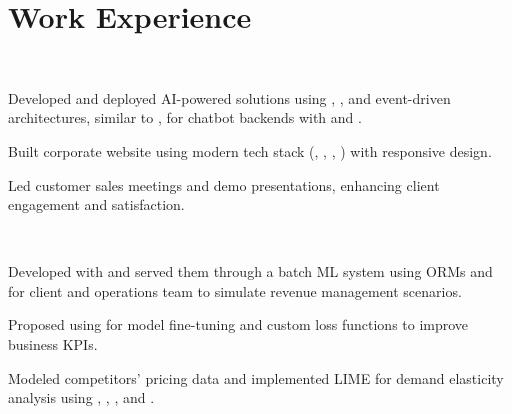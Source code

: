 \documentclass[]{tex/deedy-resume-openfont}
\begin{document}
\hfill
\begin{minipage}[t]{0.66\textwidth} 


\section{Work Experience}
\\
\vspace{\topsep}
\begin{tightemize}
    \item Developed and deployed AI-powered solutions using , , and event-driven architectures, similar to , for chatbot backends with  and .
    \item Built corporate website using modern tech stack (, , , ) with responsive design.
    \item Led customer sales meetings and demo presentations, enhancing client engagement and satisfaction.
\end{tightemize}
\sectionsep

\\
\begin{tightemize}
    \item Developed  with  and served them through a batch ML system using  ORMs and  for client and operations team to simulate revenue management scenarios.
    \item Proposed using  for model fine-tuning and custom loss functions to improve business KPIs.
    \item Modeled competitors' pricing data and implemented LIME for demand elasticity analysis using , , , and .
\end{tightemize}
\sectionsep


\end{minipage}
\end{document}
